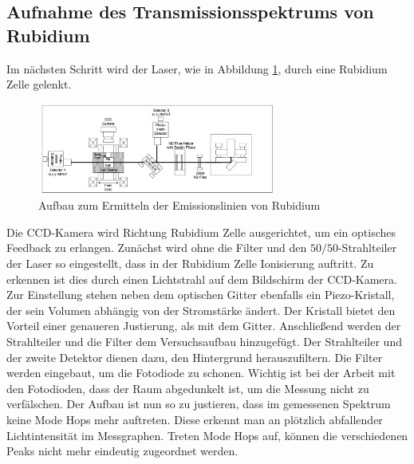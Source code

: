\subsection{Aufnahme des Transmissionsspektrums von Rubidium}
Im nächsten Schritt wird der Laser, 
wie in Abbildung \ref{fig:Rub},
durch eine Rubidium Zelle gelenkt.
\begin{figure}
    \centering
    \includegraphics[width=0.7\textwidth]{abb/rub.png}
    \caption{Aufbau zum Ermitteln der Emissionslinien von Rubidium \cite{aufbau}}
    \label{fig:Rub}
\end{figure}
Die CCD-Kamera wird Richtung Rubidium Zelle ausgerichtet,
um ein optisches Feedback zu erlangen.
Zunächst wird ohne die Filter und den $50/50$-Strahlteiler der Laser so eingestellt,
dass in der Rubidium Zelle Ionisierung auftritt.
Zu erkennen ist dies durch einen Lichtstrahl auf dem Bildschirm der CCD-Kamera.
Zur Einstellung stehen neben dem optischen Gitter ebenfalls ein Piezo-Kristall,
der sein Volumen abhängig von der Stromstärke ändert.
Der Kristall bietet den Vorteil einer genaueren Justierung, 
als mit dem Gitter.
Anschließend werden der Strahlteiler und die Filter dem Versuchsaufbau hinzugefügt.
Der Strahlteiler und der zweite Detektor dienen dazu, den Hintergrund herauszufiltern.
Die Filter werden eingebaut, um die Fotodiode zu schonen.
Wichtig ist bei der Arbeit mit den Fotodioden, 
dass der Raum abgedunkelt ist,
um die Messung nicht zu verfälschen.
Der Aufbau ist nun so zu justieren,
dass im gemessenen Spektrum keine Mode Hops mehr auftreten.
Diese erkennt man an plötzlich abfallender Lichtintensität im Messgraphen.
Treten Mode Hops auf, können die verschiedenen Peaks nicht mehr eindeutig zugeordnet werden.